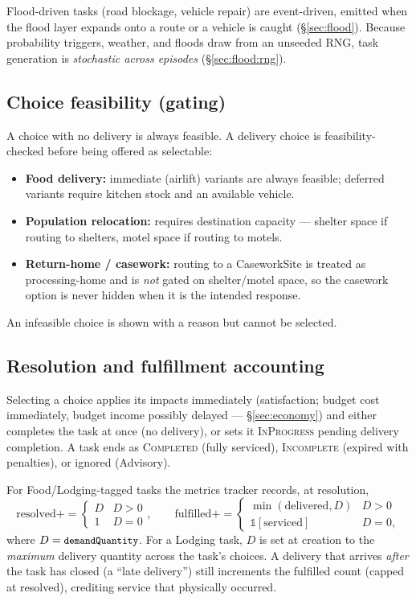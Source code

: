 \documentclass[11pt]{article}
\newcommand{\code}[1]{\texttt{\small #1}}
\begin{document}
Flood-driven tasks (road blockage, vehicle repair) are event-driven, emitted
when the flood layer expands onto a route or a vehicle is caught
(\S\ref{sec:flood}). Because probability triggers, weather, and floods draw from
an unseeded RNG, task generation is \emph{stochastic across episodes}
(\S\ref{sec:flood:rng}).

\subsection{Choice feasibility (gating)}
A choice with no delivery is always feasible. A delivery choice is feasibility-
checked before being offered as selectable:
\begin{itemize}[nosep]
\item \textbf{Food delivery:} immediate (airlift) variants are always feasible;
  deferred variants require kitchen stock and an available vehicle.
\item \textbf{Population relocation:} requires destination capacity --- shelter
  space if routing to shelters, motel space if routing to motels.
\item \textbf{Return-home / casework:} routing to a CaseworkSite is treated as
  processing-home and is \emph{not} gated on shelter/motel space, so the
  casework option is never hidden when it is the intended response.
\end{itemize}
An infeasible choice is shown with a reason but cannot be selected.

\subsection{Resolution and fulfillment accounting}
Selecting a choice applies its impacts immediately (satisfaction; budget cost
immediately, budget income possibly delayed --- \S\ref{sec:economy}) and either
completes the task at once (no delivery), or sets it \textsc{InProgress} pending
delivery completion. A task ends as \textsc{Completed} (fully serviced),
\textsc{Incomplete} (expired with penalties), or ignored (Advisory).

For Food/Lodging-tagged tasks the metrics tracker records, at resolution,
\[
  \text{resolved} \mathbin{+}{=} \begin{cases} D & D>0\\ 1 & D=0\end{cases},
  \qquad
  \text{fulfilled} \mathbin{+}{=} \begin{cases} \min(\text{delivered}, D) & D>0\\
     \mathbb{1}[\text{serviced}] & D=0,\end{cases}
\]
where $D=\code{demandQuantity}$. For a Lodging task, $D$ is set at creation to
the \emph{maximum} delivery quantity across the task's choices. A delivery that
arrives \emph{after} the task has closed (a ``late delivery'') still increments
the fulfilled count (capped at resolved), crediting service that physically
occurred.
\end{document}
